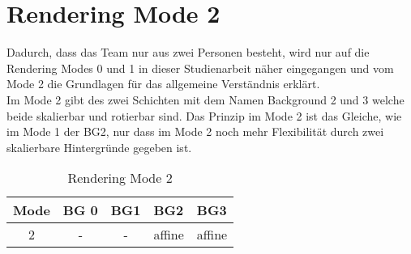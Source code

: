 \chapter{Rendering Mode 2}
Dadurch, dass das Team nur aus zwei Personen besteht, wird nur auf die Rendering Modes 0 und 1 in dieser Studienarbeit näher eingegangen und vom Mode 2 die Grundlagen für das allgemeine Verständnis erklärt. \\
Im Mode 2 gibt des zwei Schichten mit dem Namen Background 2 und 3 welche beide skalierbar und rotierbar sind.
Das Prinzip im Mode 2 ist das Gleiche, wie im Mode 1 der BG2, nur dass im Mode 2 noch mehr Flexibilität durch zwei skalierbare Hintergründe gegeben ist. \\
\begin{table}[h]
\centering
\begin{tabular}{|l|l|l|l|l|}
\hline
\textbf{Mode}           & \textbf{BG 0}          & \textbf{BG1}           & \textbf{BG2}                & \textbf{BG3}                \\ \hline
\multicolumn{1}{|c|}{2} & \multicolumn{1}{c|}{-} & \multicolumn{1}{c|}{-} & \multicolumn{1}{c|}{affine} & \multicolumn{1}{c|}{affine} \\ \hline
\end{tabular}
\caption{Rendering Mode 2}
\label{Rendering Mode 2}
\end{table}



